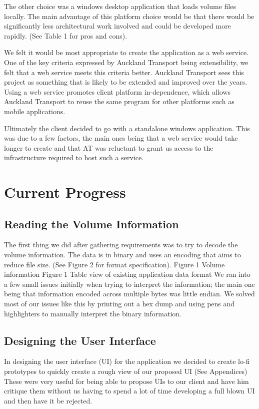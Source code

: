 \documentclass{article}
\begin{document}
The other choice was a windows desktop application that
loads volume files locally. The main advantage of this
platform choice would be that there would be significantly less
architectural work involved and could be developed more
rapidly. (See Table 1 for pros and cons).

We felt it would be most appropriate to create the
application as a web service. One of the key criteria expressed
by Auckland Transport being extensibility, we felt that a web
service meets this criteria better. Auckland Transport sees this
project as something that is likely to be extended and
improved over the years. Using a web service promotes client
platform in-dependence, which allows Auckland Transport to
reuse the same program for other platforms such as mobile
applications.

Ultimately the client decided to go with a standalone
windows application. This was due to a few factors, the main
ones being that a web service would take longer to create and
that AT was reluctant to grant us access to the infrastructure
required to host such a service.

\section{Current Progress}
\subsection{Reading the Volume Information}
The first thing we did after gathering requirements was to
try to decode the volume information. The data is in binary
and uses an encoding that aims to reduce file size. (See Figure
2 for format specification).
Figure 1 Volume information Figure 1 Table view of existing application data format
We ran into a few small issues initially when trying to
interpret the information; the main one being that information
encoded across multiple bytes was little endian.
We solved most of our issues like this by printing out a hex
dump and using pens and highlighters to manually interpret
the binary information.

\subsection{Designing the User Interface}
In designing the user interface (UI) for the application we
decided to create lo-fi prototypes to quickly create a rough
view of our proposed UI (See Appendices) These were very
useful for being able to propose UIs to our client and have him
critique them without us having to spend a lot of time
developing a full blown UI and then have it be rejected.
\end{document}
